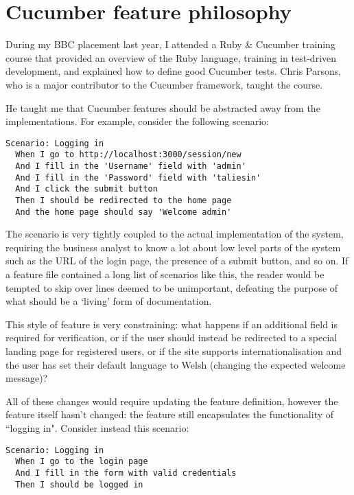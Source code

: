 \chapter{Cucumber feature philosophy}
\label{appendix:cucumber}

During my BBC placement last year, I attended a Ruby \& Cucumber training course that provided an overview of the Ruby language, training in test-driven development, and explained how to define good Cucumber tests.  Chris Parsons, who is a major contributor to the Cucumber framework, taught the course.~\cite{appendix:cucumber:parsons}

He taught me that Cucumber features should be abstracted away from the implementations. For example, consider the following scenario:

\begin{lstlisting}
Scenario: Logging in
  When I go to http://localhost:3000/session/new
  And I fill in the 'Username' field with 'admin'
  And I fill in the 'Password' field with 'taliesin'
  And I click the submit button
  Then I should be redirected to the home page
  And the home page should say 'Welcome admin'
\end{lstlisting}

The scenario is very tightly coupled to the actual implementation of the system, requiring the business analyst to know a lot about low level parts of the system such as the URL of the login page, the presence of a submit button, and so on. If a feature file contained a long list of scenarios like this, the reader would be tempted to skip over lines deemed to be unimportant, defeating the purpose of what should be a `living' form of documentation.~\cite{appendix:cucumber:livingDocumentation}

This style of feature is very constraining: what happens if an additional field is required for verification, or if the user should instead be redirected to a special landing page for registered users, or if the site supports internationalisation and the user has set their default language to Welsh (changing the expected welcome message)?

All of these changes would require updating the feature definition, however the feature itself hasn't changed: the feature still encapsulates the functionality of ``logging in". Consider instead this scenario:

\begin{lstlisting}
Scenario: Logging in
  When I go to the login page
  And I fill in the form with valid credentials
  Then I should be logged in
 \end{lstlisting}

